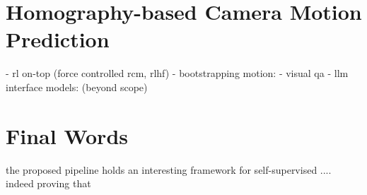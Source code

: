 \section{Homography-based Camera Motion Prediction}
\label{con:sec:hom_pred}


- rl on-top (force controlled rcm, rlhf)
- bootstrapping motion:
    - visual qa
- llm interface models:  (beyond scope)


\section{Final Words}
the proposed pipeline holds an interesting framework for self-supervised .... indeed proving that 
